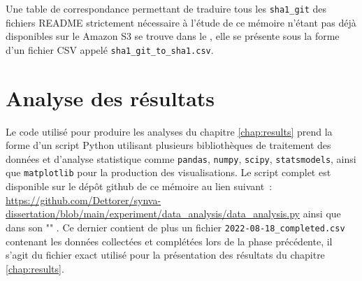 Une table de correspondance permettant de traduire tous les \texttt{sha1\_git} des fichiers README strictement
nécessaire à l'étude de ce mémoire n'étant pas déjà disponibles sur le  Amazon S3 se trouve dans
le , elle se présente sous la forme d'un fichier CSV appelé
\texttt{sha1\_git\_to\_sha1.csv}.

\section{Analyse des résultats}
\label{app:analysis.py}

Le code utilisé pour produire les analyses du chapitre \ref{chap:results} prend la forme d'un script Python
utilisant plusieurs bibliothèques de traitement des données et d'analyse statistique comme \texttt{pandas},
\texttt{numpy}, \texttt{scipy}, \texttt{statsmodels}, ainsi que \texttt{matplotlib} pour la production des
visualisations. Le script complet est disponible sur le dépôt \gls{github} de ce mémoire au lien suivant :
\url{https://github.com/Dettorer/synva-dissertation/blob/main/experiment/data_analysis/data_analysis.py} ainsi
que dans son "" \parencite{replication-package}. Ce dernier contient de plus un
fichier \texttt{2022-08-18\_completed.csv} contenant les données collectées et complétées lors de la phase
précédente, il s'agit du fichier exact utilisé pour la présentation des résultats du chapitre
\ref{chap:results}.
